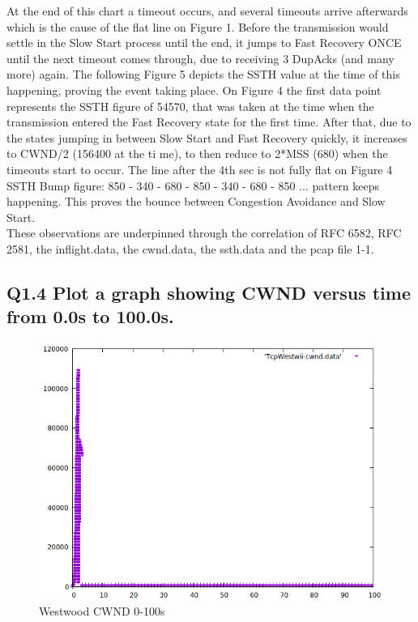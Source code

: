 \documentclass{article}
\begin{document}
At the end of this chart a timeout occurs, and several timeouts arrive afterwards which is the cause of the flat line on Figure 1. Before the transmission would settle in the Slow Start process until the end, it jumps to Fast Recovery ONCE until the next timeout comes through, due to receiving 3 DupAcks (and many more) again. The following Figure 5 depicts the SSTH value at the time of this happening, proving the event taking place. On Figure 4 the first data point represents the SSTH figure of 54570, that was taken at the time when the transmission entered the Fast Recovery state for the first time. After that, due to the states jumping in between Slow Start and Fast Recovery quickly, it increases to CWND/2 (156400 at the ti
me), to then reduce to 2*MSS (680) when the timeouts start to occur. The line after the 4th sec is not fully flat on Figure 4 SSTH Bump figure: 850 - 340 - 680 - 850 - 340 - 680 - 850 ... pattern keeps happening. This proves the bounce between Congestion Avoidance and Slow Start. 
\\
These observations are underpinned through the correlation of RFC 6582, RFC 2581, the inflight.data, the cwnd.data, the ssth.data and the pcap file 1-1.
\newpage
\subsection{Q1.4 Plot a graph showing CWND versus time from 0.0s to
100.0s.}

\begin{figure}[h]
    \centering
    \includegraphics[scale=0.4]{images/lab1-group11-task1-question4.png}
    \caption{Westwood CWND 0-100s}
    \label{fig:cwnd_deflation}
\end{figure}
\end{document}
